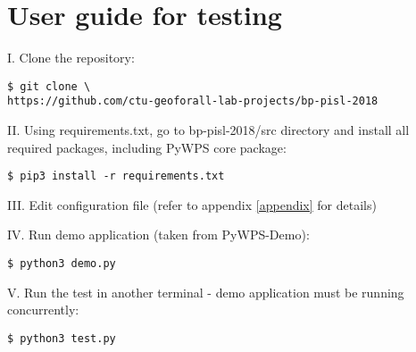 \chapter{User guide for testing} \label{testing}
\label{user-guide}



\noindent I. Clone the repository:

\begin{lstlisting}
$ git clone \
https://github.com/ctu-geoforall-lab-projects/bp-pisl-2018
\end{lstlisting}

\noindent II. Using requirements.txt, go to bp-pisl-2018/src directory and install
all required packages, including PyWPS core package:
\begin{lstlisting}
$ pip3 install -r requirements.txt
\end{lstlisting}



\noindent III. Edit configuration file (refer to appendix \ref{appendix} for details) 

\noindent IV. Run demo application (taken from PyWPS-Demo):

\begin{lstlisting}
$ python3 demo.py
\end{lstlisting}

\noindent V. Run the test in another terminal - demo application must be
running concurrently:

\begin{lstlisting}
$ python3 test.py
\end{lstlisting}






%
%
%
%
%




